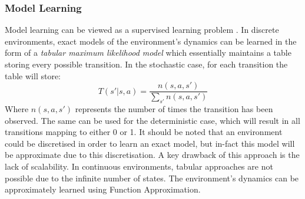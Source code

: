 \subsubsection{Model Learning}
Model learning can be viewed as a supervised learning problem \citep{JORDAN1992307}. In discrete environments, exact models of the environment's dynamics can be learned in the form of a \textit{tabular maximum likelihood model} \citep{10.1145/122344.122377} which essentially maintains a table storing every possible transition. In the stochastic case, for each transition the table will store:
\begin{equation}
\label{eqn:tmlmupdate}
T(s'|s,a) = \frac{n(s, a, s')}{\sum_{s'}n(s,a,s')}
\end{equation}
Where $n(s,a,s')$ represents the number of times the transition has been observed.
The same can be used for the deterministic case, which will result in all transitions mapping to either 0 or 1. It should be noted that an environment could be discretised in order to learn an exact model, but in-fact this model will be approximate due to this discretisation.
A key drawback of this approach is the lack of scalability.
In continuous environments, tabular approaches are not possible due to the infinite number of states. The environment's dynamics can be approximately learned using Function Approximation.
